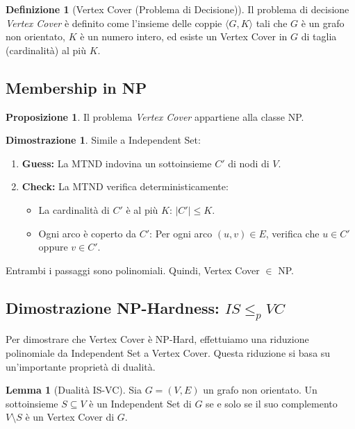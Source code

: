 \documentclass[a4paper]{article}
\theoremstyle{definition} %
\newtheorem{definition}{Definizione}[section]
\newtheorem{lemma}{Lemma}[section]
\newtheorem{proposition}{Proposizione}[section]
\theoremstyle{definition} %
\newtheorem*{proof*}{Dimostrazione}
\begin{document}
\begin{definition}[Vertex Cover (Problema di Decisione)]
Il problema di decisione \emph{Vertex Cover} è definito come l'insieme delle coppie $\langle G, K \rangle$ tali che $G$ è un grafo non orientato, $K$ è un numero intero, ed esiste un Vertex Cover in $G$ di taglia (cardinalità) al più $K$.
\end{definition}

\subsection{Membership in NP}

\begin{proposition}
Il problema \emph{Vertex Cover} appartiene alla classe NP.
\end{proposition}

\begin{proof*}
Simile a Independent Set:
\begin{enumerate}
    \item \textbf{Guess:} La MTND indovina un sottoinsieme $C'$ di nodi di $V$.
    \item \textbf{Check:} La MTND verifica deterministicamente:
    \begin{itemize}
        \item La cardinalità di $C'$ è al più $K$: $|C'| \le K$.
        \item Ogni arco è coperto da $C'$: Per ogni arco $(u, v) \in E$, verifica che $u \in C'$ oppure $v \in C'$.
    \end{itemize}
\end{enumerate}
Entrambi i passaggi sono polinomiali. Quindi, Vertex Cover $\in$ NP.
\end{proof*}

\subsection{Dimostrazione NP-Hardness: $IS \le_p VC$}

Per dimostrare che Vertex Cover è NP-Hard, effettuiamo una riduzione polinomiale da Independent Set a Vertex Cover. Questa riduzione si basa su un'importante proprietà di dualità.

\begin{lemma}[Dualità IS-VC]
Sia $G=(V, E)$ un grafo non orientato. Un sottoinsieme $S \subseteq V$ è un Independent Set di $G$ se e solo se il suo complemento $V \setminus S$ è un Vertex Cover di $G$.
\end{lemma}
\end{document}
